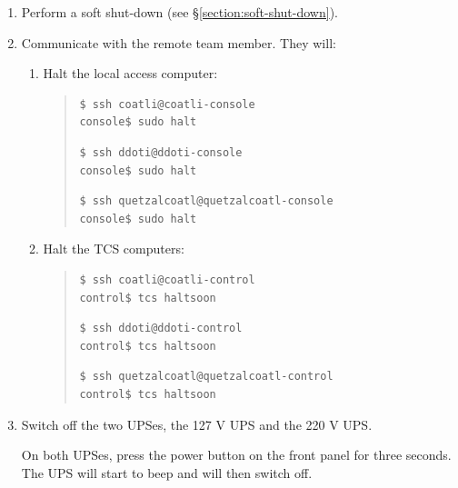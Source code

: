 \begin{enumerate}
    \item Perform a soft shut-down (see \S\ref{section:soft-shut-down}).
    \item Communicate with the remote team member. They will:
        \begin{enumerate}

            \item Halt the local access computer:

                \begin{quote}\footnotesize
                    \ifcoatli
\begin{verbatim}
$ ssh coatli@coatli-console
console$ sudo halt
\end{verbatim}
                    \fi
                    \ifddoti
\begin{verbatim}
$ ssh ddoti@ddoti-console
console$ sudo halt
\end{verbatim}
                    \fi
                    \ifquetzalcoatl
\begin{verbatim}
$ ssh quetzalcoatl@quetzalcoatl-console
console$ sudo halt
\end{verbatim}
                    \fi
                \end{quote}

            \item Halt the TCS computers:

                \begin{quote}\footnotesize
                    \ifcoatli
\begin{verbatim}
$ ssh coatli@coatli-control
control$ tcs haltsoon
\end{verbatim}
                    \fi
                    \ifddoti
\begin{verbatim}
$ ssh ddoti@ddoti-control
control$ tcs haltsoon
\end{verbatim}
                    \fi
                    \ifquetzalcoatl
\begin{verbatim}
$ ssh quetzalcoatl@quetzalcoatl-control
control$ tcs haltsoon
\end{verbatim}
                \end{quote}

        \end{enumerate}

    \item Switch off the two UPSes, the 127 V UPS and the 220 V UPS.

        On both UPSes, press the power button on the front panel for three seconds. The UPS will start to beep and will then switch off.


\end{enumerate}
